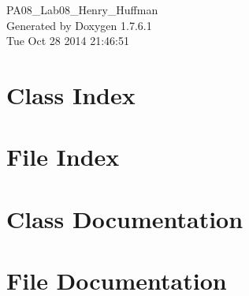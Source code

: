\documentclass[a4paper]{book}
\begin{document}
\hypersetup{pageanchor=false,citecolor=blue}
\begin{titlepage}
\vspace*{7cm}
\begin{center}
{\Large \-P\-A08\-\_\-\-Lab08\-\_\-\-Henry\-\_\-\-Huffman }\\
\vspace*{1cm}
{\large \-Generated by Doxygen 1.7.6.1}\\
\vspace*{0.5cm}
{\small Tue Oct 28 2014 21:46:51}\\
\end{center}
\end{titlepage}
\clearemptydoublepage
{}
\tableofcontents
\clearemptydoublepage
{}
\hypersetup{pageanchor=true,citecolor=blue}
\chapter{\-Class \-Index}

\chapter{\-File \-Index}

\chapter{\-Class \-Documentation}








\chapter{\-File \-Documentation}













\printindex
\end{document}
